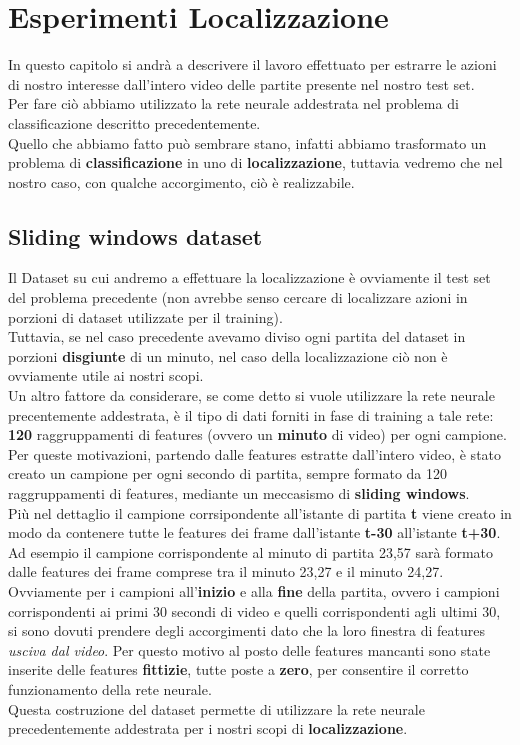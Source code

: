 \chapter{Esperimenti Localizzazione}\label{ch:chapter2}
In questo capitolo si andrà a descrivere il lavoro effettuato per estrarre le azioni di nostro interesse dall'intero video delle partite presente nel nostro test set.
\\Per fare ciò abbiamo utilizzato la rete neurale addestrata nel problema di classificazione descritto precedentemente.
\\Quello che abbiamo fatto  può sembrare stano, infatti abbiamo trasformato un problema di \textbf{classificazione} in uno di \textbf{localizzazione}, tuttavia vedremo che nel nostro caso, con qualche accorgimento, ciò è realizzabile.
\section{Sliding windows dataset}
Il Dataset su cui andremo a effettuare la localizzazione è ovviamente il test set del problema precedente (non avrebbe senso cercare di localizzare azioni in porzioni di dataset utilizzate per il training).
\\Tuttavia, se nel caso precedente avevamo diviso ogni partita del dataset in porzioni \textbf{disgiunte} di un minuto, nel caso della localizzazione ciò non è ovviamente utile ai nostri scopi.
\\Un altro fattore da considerare, se come detto si vuole utilizzare la rete neurale precentemente addestrata, è  il tipo di dati forniti in fase di training a tale rete: \textbf{120} raggruppamenti di features (ovvero un \textbf{minuto} di video) per ogni campione.
\\Per queste motivazioni, partendo dalle features estratte dall'intero video, è stato creato un campione per ogni secondo di partita, sempre formato da 120 raggruppamenti di features, mediante un meccasismo di \textbf{sliding windows}.
\\Più nel dettaglio il campione corrsipondente all'istante di partita \textbf{t} viene creato in modo da contenere tutte le features dei frame dall'istante \textbf{t-30} all'istante \textbf{t+30}.
\\Ad esempio il campione corrispondente al minuto di partita 23,57 sarà formato dalle features dei frame comprese tra il minuto 23,27 e il minuto  24,27.
\\Ovviamente per i campioni all'\textbf{inizio} e alla \textbf{fine} della partita, ovvero i campioni corrispondenti ai primi 30 secondi di video e quelli corrispondenti agli ultimi 30, si sono dovuti prendere degli accorgimenti dato che la loro finestra di features \textit{usciva dal video}. Per questo motivo al posto delle features mancanti sono state inserite delle features \textbf{fittizie}, tutte poste a \textbf{zero}, per consentire il corretto funzionamento della rete neurale.
\\Questa costruzione del dataset permette di utilizzare la rete neurale precedentemente addestrata per i nostri scopi di \textbf{localizzazione}.
